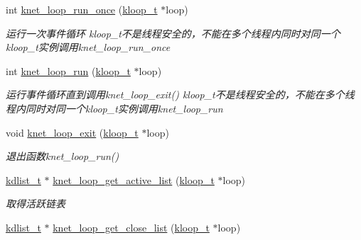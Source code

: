 \begin{DoxyCompactItemize}
int \hyperlink{a00117_ga37ab03493fb1ed037815f2cd951d762a_ga37ab03493fb1ed037815f2cd951d762a}{knet\+\_\+loop\+\_\+run\+\_\+once} (\hyperlink{a00056_a97fc76209a58362019f1ded9169e397f_a97fc76209a58362019f1ded9169e397f}{kloop\+\_\+t} $\ast$loop)
\begin{DoxyCompactList}\small\item\em 运行一次事件循环 kloop\+\_\+t不是线程安全的，不能在多个线程内同时对同一个kloop\+\_\+t实例调用knet\+\_\+loop\+\_\+run\+\_\+once \end{DoxyCompactList}\item 
int \hyperlink{a00117_gaaf104ae1337c32415bd1aa8df545ae31_gaaf104ae1337c32415bd1aa8df545ae31}{knet\+\_\+loop\+\_\+run} (\hyperlink{a00056_a97fc76209a58362019f1ded9169e397f_a97fc76209a58362019f1ded9169e397f}{kloop\+\_\+t} $\ast$loop)
\begin{DoxyCompactList}\small\item\em 运行事件循环直到调用knet\+\_\+loop\+\_\+exit() kloop\+\_\+t不是线程安全的，不能在多个线程内同时对同一个kloop\+\_\+t实例调用knet\+\_\+loop\+\_\+run \end{DoxyCompactList}\item 
void \hyperlink{a00117_ga9e04a2d06c79405f444aa53a26eedd90_ga9e04a2d06c79405f444aa53a26eedd90}{knet\+\_\+loop\+\_\+exit} (\hyperlink{a00056_a97fc76209a58362019f1ded9169e397f_a97fc76209a58362019f1ded9169e397f}{kloop\+\_\+t} $\ast$loop)
\begin{DoxyCompactList}\small\item\em 退出函数knet\+\_\+loop\+\_\+run() \end{DoxyCompactList}\item 
\hyperlink{a00056_ae098586334a621a23cef7cb17590b618_ae098586334a621a23cef7cb17590b618}{kdlist\+\_\+t} $\ast$ \hyperlink{a00076_a5de04251528407b1077e26b8a619936a_a5de04251528407b1077e26b8a619936a}{knet\+\_\+loop\+\_\+get\+\_\+active\+\_\+list} (\hyperlink{a00056_a97fc76209a58362019f1ded9169e397f_a97fc76209a58362019f1ded9169e397f}{kloop\+\_\+t} $\ast$loop)
\begin{DoxyCompactList}\small\item\em 取得活跃链表 \end{DoxyCompactList}\item 
\hyperlink{a00056_ae098586334a621a23cef7cb17590b618_ae098586334a621a23cef7cb17590b618}{kdlist\+\_\+t} $\ast$ \hyperlink{a00076_a768e24c6dbc4a4694397903a0c886d49_a768e24c6dbc4a4694397903a0c886d49}{knet\+\_\+loop\+\_\+get\+\_\+close\+\_\+list} (\hyperlink{a00056_a97fc76209a58362019f1ded9169e397f_a97fc76209a58362019f1ded9169e397f}{kloop\+\_\+t} $\ast$loop)

\end{DoxyCompactItemize}
